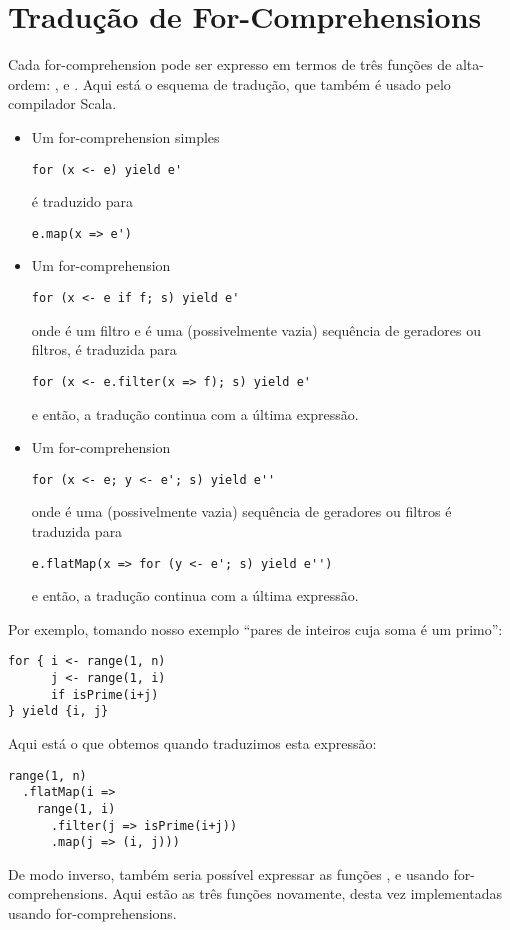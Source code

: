 \section{Tradução de For-Comprehensions}

Cada for-comprehension pode ser expresso em termos de três funções de alta-ordem: , 
 e . Aqui está o esquema de tradução, que também é usado pelo compilador Scala.
\begin{itemize}
\item
Um for-comprehension simples
\begin{lstlisting}
for (x <- e) yield e'
\end{lstlisting}
é traduzido para
\begin{lstlisting}
e.map(x => e')
\end{lstlisting}
\item
Um for-comprehension 
\begin{lstlisting}
for (x <- e if f; s) yield e'
\end{lstlisting}
onde  é um filtro e  é uma (possivelmente vazia) sequência de geradores ou filtros, 
é traduzida para 
\begin{lstlisting}
for (x <- e.filter(x => f); s) yield e'
\end{lstlisting}
e então, a tradução continua com a última expressão.
\item
Um for-comprehension 
\begin{lstlisting}
for (x <- e; y <- e'; s) yield e''
\end{lstlisting}
onde  é uma (possivelmente vazia) sequência de geradores ou filtros é traduzida para 
\begin{lstlisting}
e.flatMap(x => for (y <- e'; s) yield e'')
\end{lstlisting}
e então, a tradução continua com a última expressão.
\end{itemize}
Por exemplo, tomando nosso exemplo  ``pares de inteiros cuja soma é um primo'':
\begin{lstlisting}
for { i <- range(1, n)
      j <- range(1, i)
      if isPrime(i+j)
} yield {i, j}
\end{lstlisting}
Aqui está o que obtemos quando traduzimos esta expressão:
\begin{lstlisting}
range(1, n)
  .flatMap(i =>
    range(1, i)
      .filter(j => isPrime(i+j))
      .map(j => (i, j)))
\end{lstlisting}

De modo inverso, também seria possível expressar as funções ,  e 
usando for-comprehensions. Aqui estão as três funções novamente, desta vez implementadas usando
for-comprehensions.

